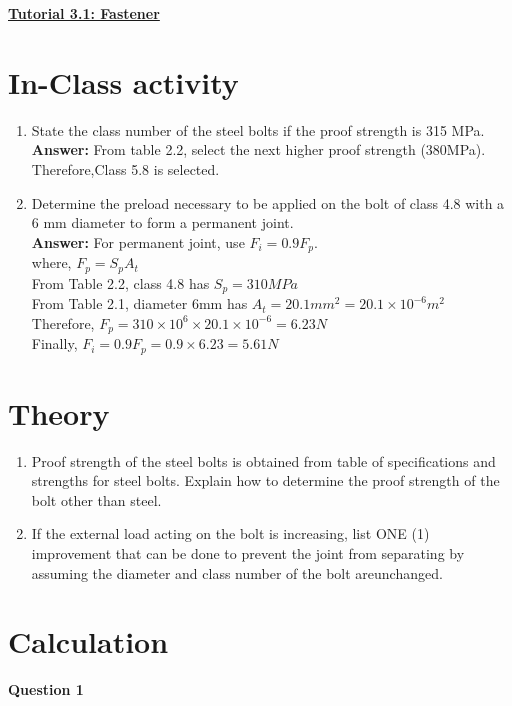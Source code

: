 \documentclass[a4paper, fleqn]{article}
\begin{document}
\underline{\textbf{Tutorial 3.1: Fastener}}
\vspace{10pt}

\section*{In-Class activity}
\begin{enumerate}
    \item State the class number of the steel bolts if the proof strength is 315 MPa. \\
    \textbf{Answer:} From table 2.2, select the next higher proof strength (380MPa). Therefore,Class 5.8 is selected.
    \item Determine the preload necessary to be applied on the bolt of class 4.8 with a 6 mm diameter to form a permanent joint.\\
    
    \textbf{Answer:} For permanent joint, use $F_i=0.9F_p$.\\
    where, $F_p=S_p A_t$\\
    From Table 2.2, class 4.8 has $S_p=310MPa$\\
    From Table 2.1, diameter 6mm has $A_t=20.1mm^2=20.1\times 10^{-6}m^2$\\
    Therefore, $F_p=310\times 10^6 \times 20.1\times 10^{-6}=6.23N$\\
    Finally, $F_i=0.9F_p=0.9\times 6.23=5.61N$\\
\end{enumerate}

\section*{Theory}

\begin{enumerate}
    \item Proof strength of the steel bolts is obtained from table of specifications and strengths for steel bolts. Explain how to determine the proof strength of the bolt other than steel.
    \item If the external load acting on the bolt is increasing, list ONE (1) improvement that can be done to prevent the joint from separating by assuming the diameter and class number of the bolt areunchanged.
\end{enumerate}


\newpage

\section*{Calculation}
\textbf{Question 1}
\end{document}

